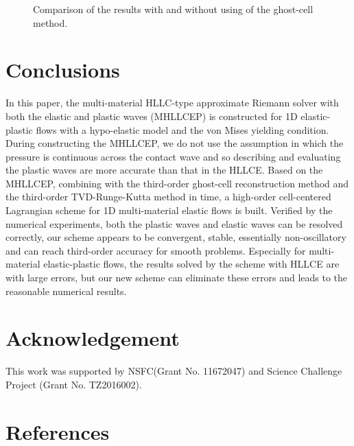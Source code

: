 \documentclass[review]{elsarticle}
\begin{document}
\begin{figure}
	  \caption{Comparison of the results with and without using of the ghost-cell method.}
      \label{fig:multi22}
    \end{figure}

%
\section*{Conclusions}
In this paper,  the multi-material HLLC-type  approximate Riemann solver with both the elastic and plastic waves (MHLLCEP) is constructed for 1D elastic-plastic  flows with a hypo-elastic model and the von Mises yielding condition. During constructing the  MHLLCEP, we do not use the assumption in which the pressure is continuous across the contact wave and so describing and evaluating the plastic waves are  more accurate than that in the  HLLCE.  Based on the MHLLCEP,
combining with the third-order ghost-cell reconstruction method and the third-order TVD-Runge-Kutta method in time, a high-order cell-centered Lagrangian scheme for 1D multi-material elastic flows is built. Verified by the numerical experiments, both the plastic waves and elastic waves can be resolved correctly, our scheme appears to be convergent, stable, essentially non-oscillatory and can reach third-order accuracy for smooth problems. Especially for multi-material elastic-plastic flows, the results solved by the scheme with HLLCE are with large errors, but our new scheme can eliminate these errors and leads to the reasonable numerical results.

%
\section*{Acknowledgement}
This work was supported by NSFC(Grant No. 11672047) and Science Challenge Project (Grant No. TZ2016002).


\section*{References}



\newpage
  \appendix
  \renewcommand{\appendixname}{Appendix~}
\end{document}
